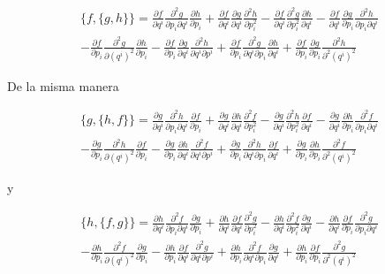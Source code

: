 \documentclass[a4paper,10pt]{article}
\numberwithin{equation}{section}
\begin{document}
\begin{align}
  \{f,\{g,h\}\} = \frac{\partial f}{\partial q^i}
  \frac{\partial^2 g}{\partial p_i\partial q^i}\frac{\partial h}{\partial p_i} 
  + \frac{\partial f}{\partial q^i}
  \frac{\partial g}{\partial q^i}\frac{\partial^2 h}{\partial p_i^2} 
  -\frac{\partial f}{\partial q^i}
  \frac{\partial^2 g}{\partial p_i^2}\frac{\partial h}{\partial q^i} 
  -\frac{\partial f}{\partial q^i} 
  \frac{\partial g}{\partial p_i}\frac{\partial^2 h}{\partial p_i \partial q^i} \\
  - \frac{\partial f}{\partial p_i}\frac{\partial^2 g}{\partial (q^i)^2}
  \frac{\partial h}{\partial p_i} - \frac{\partial f}{\partial p_i}\frac{\partial g}{\partial q^i}
  \frac{\partial^2 h}{\partial q^i\partial p^i} + \frac{\partial f}{\partial p_i}\frac{\partial^2 g}{\partial q^i\partial p_i}
  \frac{\partial h}{\partial q^i} + \frac{\partial f}{\partial p_i}\frac{\partial g}{\partial p_i}
  \frac{\partial^2 h}{\partial^2(q^i)^2}
\end{align}

De la misma manera 

\begin{align}
  \{g,\{h,f\}\} = \frac{\partial g}{\partial q^i}
  \frac{\partial^2 h}{\partial p_i\partial q^i}\frac{\partial f}{\partial p_i} 
  + \frac{\partial g}{\partial q^i}
  \frac{\partial h}{\partial q^i}\frac{\partial^2 f}{\partial p_i^2} 
  -\frac{\partial g}{\partial q^i}
  \frac{\partial^2 h}{\partial p_i^2}\frac{\partial f}{\partial q^i} 
  -\frac{\partial g}{\partial q^i} 
  \frac{\partial h}{\partial p_i}\frac{\partial^2 f}{\partial p_i \partial q^i} \\
   - \frac{\partial g}{\partial p_i}\frac{\partial^2 h}{\partial (q^i)^2}
  \frac{\partial f}{\partial p_i} - \frac{\partial g}{\partial p_i}\frac{\partial h}{\partial q^i}
  \frac{\partial^2 f}{\partial q^i\partial p^i} + \frac{\partial g}{\partial p_i}\frac{\partial^2 h}{\partial q^i\partial p_i}
  \frac{\partial f}{\partial q^i} + \frac{\partial g}{\partial p_i}\frac{\partial h}{\partial p_i}
  \frac{\partial^2 f}{\partial^2(q^i)^2}
\end{align}

y

\begin{align}
  \{h,\{f,g\}\} = \frac{\partial h}{\partial q^i}
  \frac{\partial^2 f}{\partial p_i\partial q^i}\frac{\partial g}{\partial p_i} 
  + \frac{\partial h}{\partial q^i}
  \frac{\partial f}{\partial q^i}\frac{\partial^2 g}{\partial p_i^2} 
  -\frac{\partial h}{\partial q^i}
  \frac{\partial^2 f}{\partial p_i^2}\frac{\partial g}{\partial q^i} 
  -\frac{\partial h}{\partial q^i} 
  \frac{\partial f}{\partial p_i}\frac{\partial^2 g}{\partial p_i \partial q^i} \\
  - \frac{\partial h}{\partial p_i}\frac{\partial^2 f}{\partial (q^i)^2}
  \frac{\partial g}{\partial p_i} - \frac{\partial h}{\partial p_i}\frac{\partial f}{\partial q^i}
  \frac{\partial^2 g}{\partial q^i\partial p^i} + \frac{\partial h}{\partial p_i}\frac{\partial^2 f}{\partial q^i\partial p_i}
  \frac{\partial g}{\partial q^i} + \frac{\partial h}{\partial p_i}\frac{\partial f}{\partial p_i}
  \frac{\partial^2 g}{\partial^2(q^i)^2}
\end{align}
\end{document}
